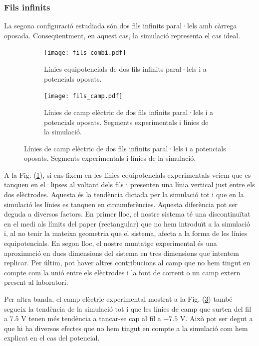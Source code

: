 \documentclass[11pt]{article}
\numberwithin{equation}{section}
\numberwithin{figure}{section}
\numberwithin{table}{section}
\begin{document}
\subsubsection{Fils infinits}\label{sec: fils}
La segona configuració estudiada són dos fils infinits paral·lels amb càrrega oposada. Conseqüentment, en aquest cas, la simulació representa el cas ideal.
\begin{figure}[h]
    \centering
    \begin{subfigure}{0.495\textwidth}
        \centering
        \texttt{[image: fils\_combi.pdf]}
        \caption{Línies equipotencials de dos fils infinits paral·lels i a potencials oposats.}
        \label{fig: fils_pot}
    \end{subfigure}
    \begin{subfigure}{0.495\textwidth} 
        \centering
        \texttt{[image: fils\_camp.pdf]}
        \caption{Línies de camp elèctric de dos fils infinits paral·lels i a potencials oposats. Segments experimentals i línies de la simulació.}
        \label{fig: fils_camp}
    \end{subfigure}
\end{figure}


A la Fig. (\ref{fig: fils_pot}), si ens fixem en les línies equipotencials experimentals veiem que es tanquen en el·lipses al voltant dels fils i presenten una línia vertical just entre els dos elèctrodes. Aquesta és la tendència dictada per la simulació tot i que en la simulació les línies es tanquen en circumferències. Aquesta diferència pot ser deguda a diversos factors. En primer lloc, el nostre sistema té una discontinuïtat en el medi als límits del paper (rectangular) que no hem introduït a la simulació i, al no tenir la mateixa geometria que el sistema, afecta a la forma de les línies equipotencials. En segon lloc, el nostre muntatge experimental és una aproximació en dues dimensions del sistema en tres dimensions que intentem replicar. Per últim, pot haver altres contribucions al camp que no hem tingut en compte com la unió entre els elèctrodes i la font de corrent o un camp extern present al laboratori.

Per altra banda, el camp elèctric  experimental mostrat a la Fig. (\ref{fig: fils_camp}) també segueix la tendència de la simulació tot i que les línies de camp que surten del fil a $7.5$ V tenen més tendència a tancar-se cap al fil a $-7.5$ V. Això pot ser degut a que hi ha diversos efectes que no hem tingut en compte a la simulació com hem explicat en el cas del potencial. 
\end{document}
